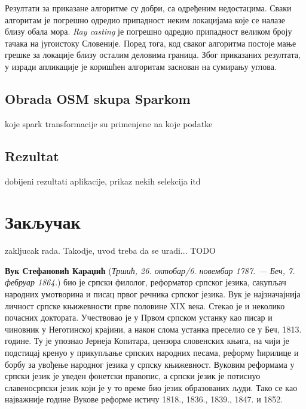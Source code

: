 \documentclass[12pt,oneside]{memoir}
\begin{document}
Резултати за приказане алгоритме су добри, са одређеним недостацима. Сваки алгоритам је погрешно одредио припадност неким локацијама које се налазе близу обала мора. \textit{Ray casting} је погрешно одредио припадност великом броју тачака на југоистоку Словеније. Поред тога, код сваког алгоритма постоје мање грешке за локације близу осталим деловима граница. Због приказаних резултата, у изради апликације је коришћен алгоритам заснован на сумирању углова.

\section{Obrada OSM skupa Sparkom}
\label{sec:osm_spark_obrada}

koje spark transformacije su primenjene na koje podatke

\section{Rezultat}
\label{sec:rezultat}

dobijeni rezultati aplikacije, prikaz nekih selekcija itd

\chapter{Закључак}
\label{chp:zakljucak}

zakljucak rada. Takodje, uvod treba da se uradi... TODO


\literatura

\backmatter

\begin{biografija}
\textbf{Вук Стефановић Караџић} (\emph{Тршић, 26. октобар/6. новембар
  1787. — Беч, 7. фебруар 1864.}) био је српски филолог, реформатор
српског језика, сакупљач народних умотворина и писац првог речника
српског језика.  Вук је најзначајнија личност српске књижевности прве
половине XIX века. Стекао је и неколико почасних доктората.
Учествовао је у Првом српском устанку као писар и чиновник у
Неготинској крајини, а након слома устанка преселио се у Беч,
1813. године. Ту је упознао Јернеја Копитара, цензора словенских
књига, на чији је подстицај кренуо у прикупљање српских народних
песама, реформу ћирилице и борбу за увођење народног језика у српску
књижевност. Вуковим реформама у српски језик је уведен фонетски
правопис, а српски језик је потиснуо славеносрпски језик који је у то
време био језик образованих људи. Тако се као најважније године Вукове
реформе истичу 1818., 1836., 1839., 1847. и 1852.
\end{biografija}
\end{document}

